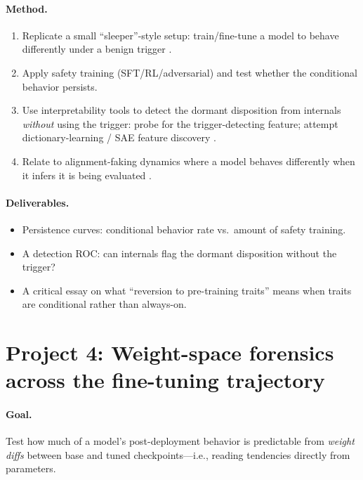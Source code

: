 \documentclass[11pt]{article}
\begin{document}
\paragraph{Method.}
\begin{enumerate}[leftmargin=1.5em]
  \item Replicate a small ``sleeper''-style setup: train/fine-tune a model to
  behave differently under a benign trigger \citep{hubinger2024sleeper}.
  \item Apply safety training (SFT/RL/adversarial) and test whether the
  conditional behavior persists.
  \item Use interpretability tools to detect the dormant disposition from
  internals \emph{without} using the trigger: probe for the trigger-detecting
  feature; attempt dictionary-learning / SAE feature discovery
  \citep{bricken2023monosemanticity,templeton2024scaling}.
  \item Relate to alignment-faking dynamics where a model behaves differently
  when it infers it is being evaluated \citep{greenblatt2024alignment}.
\end{enumerate}

\paragraph{Deliverables.}
\begin{itemize}[leftmargin=1.5em]
  \item Persistence curves: conditional behavior rate vs.\ amount of safety
  training.
  \item A detection ROC: can internals flag the dormant disposition without the
  trigger?
  \item A critical essay on what ``reversion to pre-training traits'' means when
  traits are conditional rather than always-on.
\end{itemize}

\section*{Project 4: Weight-space forensics across the fine-tuning trajectory}

\paragraph{Goal.} Test how much of a model's post-deployment behavior is
predictable from \emph{weight diffs} between base and tuned checkpoints---i.e.,
reading tendencies directly from parameters.
\end{document}
